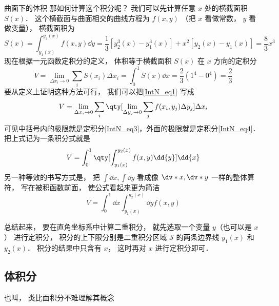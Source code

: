 \begin{exam}{曲面下的体积}
那如何计算这个积分呢？ 我们可以先计算任意 $x$ 处的横截面积 $S(x)$． 这个横截面与曲面相交的曲线方程为 $f(x,y)$ （把 $x$ 看做常数， $y$ 看做变量）， 横截面积为
\begin{equation}\label{IntN_eq3}
S(x) = \int_{y_1(x)}^{y_2(x)} f(x,y) \dd{y} = \frac13 [y_2^3(x) - y_1^3(x)] + x^2[y_2(x) - y_1(x)] = \frac83 x^3
\end{equation}
现在根据一元函数定积分的定义， 体积等于横截面积 $S(x)$ 在 $x$ 方向的定积分
\begin{equation}\label{IntN_eq4}
V = \lim_{\Delta x_i\to 0} \sum_{i} S(x_i) \Delta x_i = \int_0^1 S(x) \dd{x} = \frac23 (1^4 -0^4) = \frac23
\end{equation}
要从定义上证明这种方法可行， 我们可以把\autoref{IntN_eq1} 写成
\begin{equation}
V = \lim_{\Delta x_i\to 0} \sum_{i} \qty[\lim_{\Delta y_j\to 0}\sum_{j} f(x_i,y_j) \Delta y_j ] \Delta x_i
\end{equation}
可见中括号内的极限就是定积分\autoref{IntN_eq3}，外面的极限就是定积分\autoref{IntN_eq4}． 把上式记为一条积分式就是
\begin{equation}
V = \int_0^1 \qty[\int_{y_1(x)}^{y_2(x)} f(x,y) \dd{y}] \dd{x}
\end{equation}
另一种等效的书写方式是， 把 $\int \dd{x}, \int \dd{y}$ 看成像 $\dv*{x}, \dv*{y}$ 一样的整体算符， 写在被积函数前面， 使公式看起来更为简洁
\begin{equation}\label{IntN_eq7}
V = \int_0^1 \dd{x} \int_{y_1(x)}^{y_2(x)} \dd{y} f(x,y)
\end{equation}
\end{exam}

总结起来， 要在直角坐标系中计算二重积分， 就先选取一个变量 $y$（也可以是 $x$） 进行定积分， 积分的上下限分别是二重积分区域 $\mathcal{S}$ 的两条边界线 $y_1(x)$ 和 $y_2(x)$． 积分的结果中只含有 $x$， 这时再对 $x$ 进行定积分即可．

\subsection{体积分}
也叫， 类比面积分不难理解其概念

